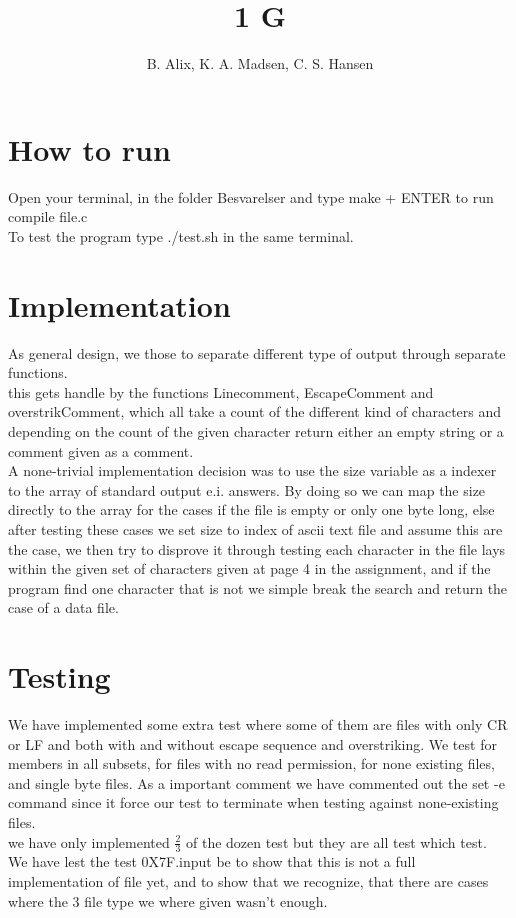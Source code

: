 \documentclass[12pt,a4paper]{article}
\author{B. Alix, K. A. Madsen, C. S. Hansen}
\title{1 G}
\begin{document}
\clearpage\maketitle
\thispagestyle{empty}
\setcounter{page}{0}
\newpage

\section*{How to run}
Open your terminal, in the folder Besvarelser and type make + ENTER to run compile file.c
\\[10pt]
To test the program type ./test.sh in the same terminal.
\\[10pt]
\section*{Implementation}
As general design, we those to separate different type of output through separate functions. 
\\
this gets handle by the functions Linecomment, EscapeComment and overstrikComment, 
which all take a count of the different kind of characters and depending on the count of the given character return either an empty string or a comment given as a comment.
\\
A none-trivial implementation decision was to use the size variable as a indexer to the array of standard output e.i. answers. By doing so we can map the size directly to the array for the cases if the file is empty or only one byte long, else after testing these cases we set size to index of ascii text file and assume this are the case, we then try to disprove it through testing each character in the file lays within the given set of characters given at page 4 in the assignment, and if the program find one character that is not we simple break the search and return the case of a data file.

\section*{Testing}
We have implemented some extra test where some of them are files with only CR or LF and both with and without escape sequence and overstriking. We test for members in all subsets, for files with no read permission, for none existing files, and single byte files. As a important comment we have commented out the set -e command since it force our test to terminate when testing against none-existing files.
\\
we have only implemented $\frac{2}{3}$ of the dozen test but they are all test which test.
\\[10pt]
We have lest the test 0X7F.input be to show that this is not a full implementation of file yet, and to show that we recognize, that there are cases where the 3 file type we where given wasn't enough. 
\end{document}
